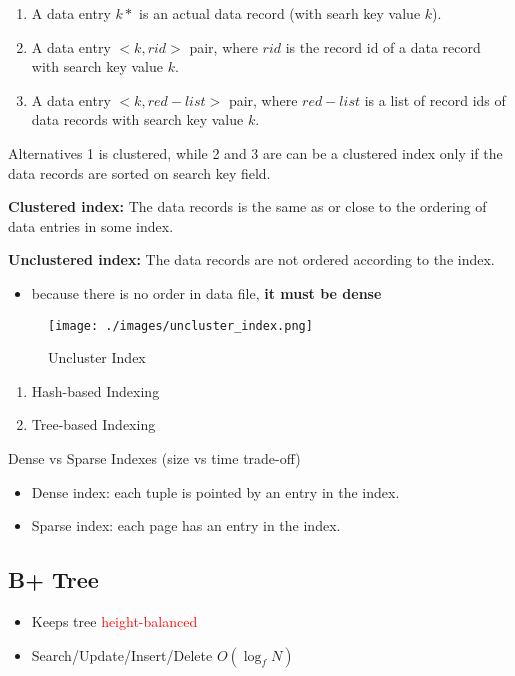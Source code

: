 \documentclass[12pt,a4paper]{article}
\begin{document}
\begin{enumerate}
    \item A data entry $k*$ is an actual data record (with searh key value $k$).
    \item A data entry $<k, rid>$ pair, where $rid$ is the record id of a data record with search key value $k$.
    \item A data entry $<k, red-list>$ pair, where $red-list$ is a list of record ids of data records with search key value $k$. 
\end{enumerate}

Alternatives 1 is clustered, while 2 and 3 are can be a clustered index only if the data records are sorted on search key field.

\textbf{Clustered index:} The data records is the same as or close to the ordering of data entries in some index.

\textbf{Unclustered index:} The data records are not ordered according to the index.

\begin{itemize}
    \item because there is no order in data file, \textbf{it must be dense}
\end{itemize}

\begin{figure}[ht]
    \centering
    \texttt{[image: ./images/uncluster\_index.png]}
    \caption{Uncluster Index}
    \label{fig:uncluster_index}
\end{figure}

\begin{enumerate}
    \item Hash-based Indexing
    \item Tree-based Indexing
\end{enumerate}

Dense vs Sparse Indexes (size vs time trade-off)

\begin{itemize}
    \item Dense index: each tuple is pointed by an entry in the index.
    \item Sparse index: each page has an entry in the index.
\end{itemize}

\subsection*{B+ Tree}

\begin{itemize}
    \item Keeps tree \textcolor{red}{height-balanced}
    \item Search/Update/Insert/Delete $O(\log_f{N})$
\end{itemize}
\end{document}
